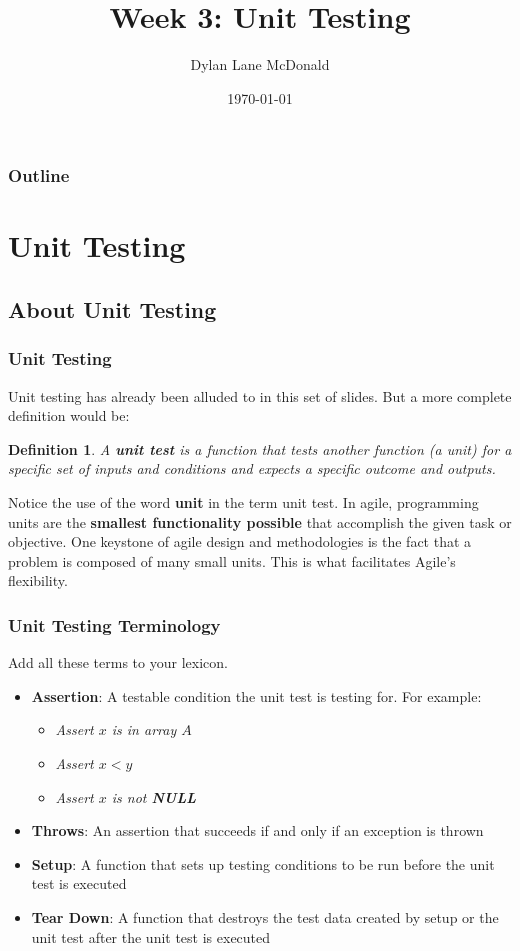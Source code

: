\documentclass[aspectratio=169]{beamer}
\title{Week 3: Unit Testing}
\author{Dylan Lane McDonald}
\institute{CNM STEMulus Center\\Web Development with PHP}
\date{\today}
\newtheorem{defn}{Definition}
\begin{document}
\lstset{language=Java}
\begin{frame}
\titlepage
\end{frame}

\begin{frame}
\frametitle{Outline}
\tableofcontents
\end{frame}

\section{Unit Testing}
\subsection{About Unit Testing}
\begin{frame}
\frametitle{Unit Testing}
Unit testing has already been alluded to in this set of slides. But a more complete definition would be:
\begin{defn}
A \textbf{unit test} is a function that tests another function (a \emph{unit}) for a specific set of inputs and conditions and expects a specific outcome and outputs.
\end{defn}

\pause
Notice the use of the word \textbf{unit} in the term unit test. In agile, programming units are the \textbf{smallest functionality possible} that accomplish the given task or objective. One keystone of agile design and methodologies is the fact that a problem is composed of many small units. This is what facilitates Agile's flexibility.
\end{frame}

\begin{frame}
\frametitle{Unit Testing Terminology}
Add all these terms to your lexicon.
\begin{itemize}
	\item \textbf{Assertion}: A testable condition the unit test is testing for. For example:
	\begin{itemize}
		\item \textit{Assert $x$ is in array $A$}
		\item \textit{Assert $x < y$}
		\item \textit{Assert $x$ is not \textbf{NULL}}
	\end{itemize}
	\item \textbf{Throws}: An assertion that succeeds if and only if an exception is thrown
	\item \textbf{Setup}: A function that sets up testing conditions to be run before the unit test is executed
	\item \textbf{Tear Down}: A function that destroys the test data created by setup or the unit test after the unit test is executed
\end{itemize}
\end{frame}
\end{document}
